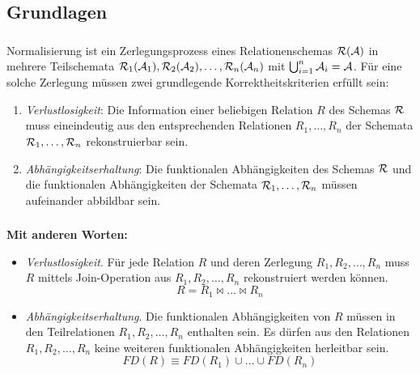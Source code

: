 \subsection{Grundlagen}

\begin{frame}[t]
\frametitle{\insertsection}
\framesubtitle{\insertsubsection}
\begin{definition}[Normalisierung]
	Normalisierung ist ein Zerlegungsprozess eines Relationenschemas $\mathcal{R}(\mathcal{A})$ in mehrere Teilschemata 
	$\mathcal{R}_1(\mathcal{A}_1),\mathcal{R}_2(\mathcal{A}_2),\dots ,\mathcal{R}_n(\mathcal{A}_n)$ mit $\bigcup_{i=1}^n\mathcal{A}_i = \mathcal{A}$. 
	\abs
	F\"ur eine solche Zerlegung m\"ussen zwei grundlegende Korrektheitskriterien erf\"ullt sein:\\[4pt]
	\begin{enumerate}
		\pause
		\item \emph{Verlustlosigkeit}: Die Information einer beliebigen Relation $R$ des Schemas $\mathcal{R}$ muss 
		eineindeutig aus den entsprechenden Relationen $R_1,\ldots , R_n$ der Schemata 
		$\mathcal{R}_1,\dots ,\mathcal{R}_n$ rekonstruierbar sein.\\[4pt]
		\pause
		\abs
		\item \emph{Abh\"angigkeitserhaltung}: Die funktionalen Abh\"angigkeiten des Schemas $\mathcal{R}$ und die 
		funktionalen Abh\"angigkeiten der Schemata $\mathcal{R}_1,\dots ,\mathcal{R}_n$ m\"ussen aufeinander abbildbar sein.		
	\end{enumerate}
\end{definition}
\end{frame}
%
%

\begin{frame}[t]
\frametitle{\insertsection}
\framesubtitle{\insertsubsection}
\onslide
\begin{block}{\textbf{Mit anderen Worten:}}
	\begin{itemize}
		\item \emph{Verlustlosigkeit}. F\"ur jede Relation $R$ und deren Zerlegung $R_1,R_2,\dots ,R_n$ muss $R$ mittels Join-Operation 
		aus $R_1,R_2,\dots ,R_n$ rekonstruiert werden k\"onnen.
		$$R=R_1\Join\ldots\Join R_n$$
		\pause
		\item \emph{Abh\"angigkeitserhaltung}. Die funktionalen Abh\"angigkeiten von $R$ m\"ussen in den Teilrelationen 
		$R_1,R_2,\dots , R_n$ enthalten sein. Es d\"urfen aus den Relationen $R_1,R_2,\dots, R_n$ keine weiteren funktionalen 
		Abh\"angigkeiten herleitbar sein.
		$$FD(R)\equiv FD(R_1)\cup\ldots\cup FD(R_n)$$
	\end{itemize}
\end{block}
\end{frame}

